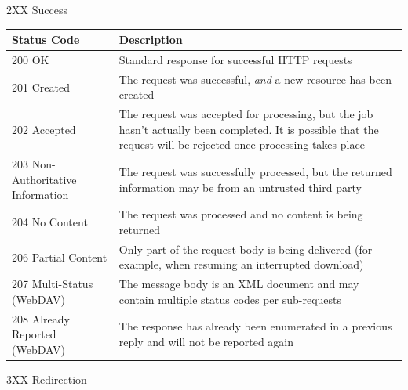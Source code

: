 \documentclass[final]{beamer}
\begin{document}
\begin{frame}{}
\begin{block}{\huge 2XX Success}
      \vspace{0.3in}

      \begin{tabular}{p{} p{}}
        Status Code & Description \\ \hline
        200 OK & Standard response for successful HTTP requests \\
        201 Created & The request was successful, \emph{and} a new resource has been created \\
        202 Accepted & The request was accepted for processing, but the job hasn't actually been completed. It is possible that the request will be rejected once processing takes place \\
        203 Non-Authoritative Information & The request was successfully processed, but the returned information may be from an untrusted third party \\
        204 No Content & The request was processed and no content is being returned \\
        206 Partial Content & Only part of the request body is being delivered (for example, when resuming an interrupted download) \\
        207 Multi-Status (WebDAV) & The message body is an XML document and may contain multiple status codes per sub-requests \\
        208 Already Reported (WebDAV) & The response has already been enumerated in a previous reply and will not be reported again\\
      \end{tabular}
    \end{block}
    \begin{block}{\huge 3XX Redirection}

      \vspace{0.3in}


\end{block}
\end{frame}
\end{document}

